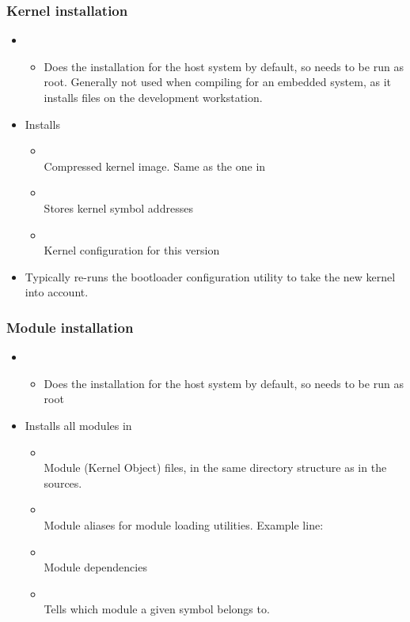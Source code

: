 \begin{frame}
  \frametitle{Kernel installation}
  \begin{itemize}
  \item {}
    \begin{itemize}
    \item Does the installation for the host system by default, so
      needs to be run as root. Generally not used when compiling for
      an embedded system, as it installs files on the development
      workstation.
    \end{itemize}
  \item Installs
    \begin{itemize}
    \item {} \\
      Compressed kernel image. Same as the one in
    \item {}\\
      Stores kernel symbol addresses
    \item {}\\
      Kernel configuration for this version
    \end{itemize}
  \item Typically re-runs the bootloader configuration utility to take
    the new kernel into account.
  \end{itemize}
\end{frame}

\begin{frame}
  \frametitle{Module installation}
  \begin{itemize}
  \item {}
    \begin{itemize}
    \item Does the installation for the host system by default, so
      needs to be run as root
    \end{itemize}
  \item Installs all modules in 
    \begin{itemize}
    \item {}\\
      Module  (Kernel Object) files, in the same directory
      structure as in the sources.
    \item {}\\
      Module aliases for module loading utilities. Example line:\\
    \item {}\\
      Module dependencies
    \item {}\\
      Tells which module a given symbol belongs to.
    \end{itemize}
  \end{itemize}
\end{frame}

